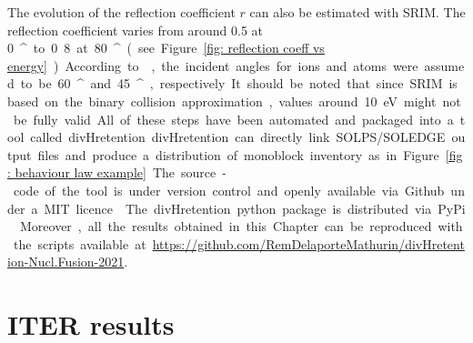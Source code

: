 The evolution of the reflection coefficient $r$ can also be estimated with SRIM.
The reflection coefficient varies from around 0.5 at \SI{0}{^\circ} to 0.8 at \SI{80}{^\circ} (see Figure \ref{fig: reflection coeff vs energy}).
According to , the incident angles for ions and atoms were assumed to be \SI{60}{^\circ} and \SI{45}{^\circ}, respectively.
It should be noted that since SRIM is based on the binary collision approximation, values around \SI{10}{eV} might not be fully valid.

All of these steps have been automated and packaged into a tool called divHretention.
divHretention can directly link SOLPS/SOLEDGE output files and produce a distribution of monoblock inventory as in Figure \ref{fig: behaviour law example}.
The source-code of the tool is under version control and openly available via Github under a MIT licence \cite{delaporte-mathurin_irfmdivhretention_2021}.
The divHretention python package is distributed via PyPi \cite{delaporte-mathurin_divhretention_nodate}.
Moreover, all the results obtained in this Chapter can be reproduced with the scripts available at \href{https://github.com/RemDelaporteMathurin/divHretention-Nucl.Fusion-2021}{https://github.com/RemDelaporteMathurin/divHretention-Nucl.Fusion-2021}.

\section{ITER results}





